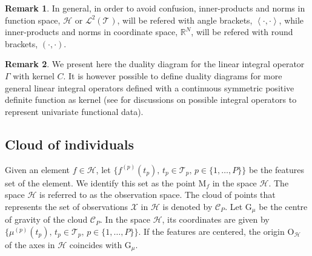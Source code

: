 \documentclass[times,sort&compress,3p]{elsarticle}
\theoremstyle{plain}%
\theoremstyle{definition}
\newtheorem{remark}{Remark}
\newcommand{\RR}{\mathbb{R}} %
\newcommand{\TT}[1]{\mathcal{T}_{#1}} %
\newcommand{\sLp}[1]{\mathcal{L}^{2}(#1)} %
\newcommand{\HH}{\mathcal{H}} %
\newcommand{\inLp}[2]{\left\langle#1, #2\right\rangle} %
\newcommand{\inR}[2]{\left(#1, #2\right)}
\newcommand{\mup}[1]{\mu^{(#1)}} %
\newcommand{\pobs}[1]{\mathrm{#1}} %
\newcommand{\Gmu}{\pobs{G}_{\!\mu}} %
\newcommand{\OH}{\pobs{O}_{\!\mathcal{H}}} %
\newcommand{\CP}{\mathcal{C}_{\!P}} %
\begin{document}
\begin{remark}
   In general, in order to avoid confusion, inner-products and norms in function space, $\HH$ or $\sLp{\TT{}}$, will be refered with angle brackets, $\inLp{\cdot}{\cdot}$, while inner-products and norms in coordinate space, $\RR^N$,  will be refered with round brackets, $\inR{\cdot}{\cdot}$.
\end{remark}

\begin{remark}\label{rem:rhks}
We present here the duality diagram for the linear integral operator $\Gamma$ with kernel $C$. It is however possible to define duality diagrams for more general linear integral operators defined with a continuous symmetric positive definite function as kernel (see \cite{gonzalezRepresentingFunctionalData2010,wongNonparametricOperatorregularizedCovariance2019a} for discussions on possible integral operators to represent univariate functional data).
\end{remark}

\subsection{Cloud of individuals} %
\label{sub:cloud_of_individuals}

Given an element $f \in \HH$, let $\{f^{(p)}(t_p),\,t_p \in \TT{p},\,p \in \{1, \dots, P\}\}$ be the features set of the element. We identify this set as the point $\pobs{M}_f$ in the space $\HH$. The space $\HH$ is referred to as the observation space. The cloud of points that represents the set of observations $\mathcal{X}$ in $\HH$ is denoted by $\CP$. Let $\Gmu$ be the centre of gravity of the cloud $\CP$. In the space $\HH$, its coordinates are given by $\{\mup{p}(t_p),\,t_p \in \TT{p},\,p \in \{1, \dots, P\}\}$. If the features are centered, the origin $\OH$ of the axes in $\HH$ coincides with $\Gmu$.
\end{document}
